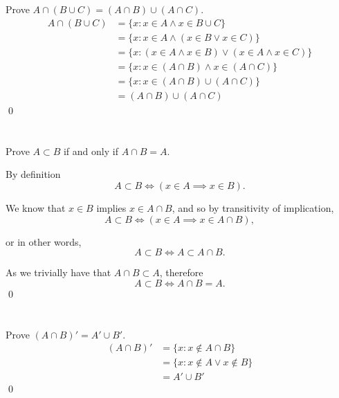\section{}\label{sec:7}

Prove $A \cap (B \cup C) = (A \cap B) \cup (A \cap C)$.
\hr
\begin{align*}
    A \cap (B \cup C) &= \{x : x \in A \land x \in B \cup C\} \\
    &= \{x : x \in A \land (x \in B \lor x \in C)\} \\
    &= \{x : (x \in A \land x \in B) \lor (x \in A \land x \in C)\} \\
    &= \{x : x \in (A \cap B) \land x \in (A \cap C)\} \\
    &= \{x : x \in (A \cap B) \cup (A \cap C)\} \\
    &= (A \cap B) \cup (A \cap C)
\end{align*}\qed

\section{}\label{sec:8}

Prove $A \subset B$ if and only if $A \cap B = A$.

\hr
By definition
\[A \subset B \iff (x \in A \implies x \in B).\]

We know that $x \in B$ implies $x \in A \cap B$, and so by transitivity of implication,
\[A \subset B \iff (x \in A \implies x \in A \cap B),\]

or in other words,
\[A \subset B \iff A \subset A \cap B.\]

As we trivially have that $A \cap B \subset A$, therefore
\[A \subset B \iff A \cap B = A.\]\qed

\section{}\label{sec:9}

Prove $(A \cap B)' = A' \cup B'$.
\hr
\begin{align*}
    (A \cap B)' &= \{x : x \notin A \cap B\} \\
    &= \{x : x \notin A \lor x \notin B\} \\
    &= A' \cup B'
\end{align*}\qed
\pagebreak
\section{}\label{sec:10}

